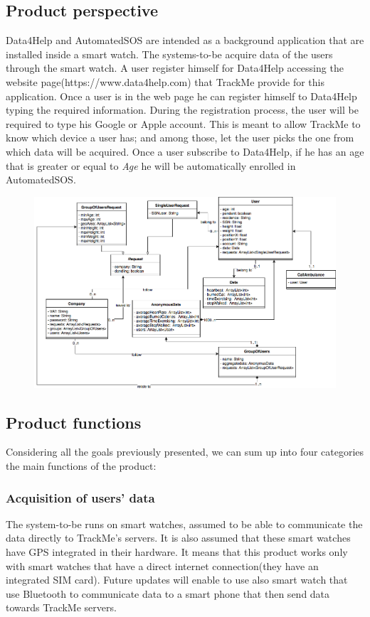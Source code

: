 \documentclass{article}
\begin{document}
\subsection{Product perspective}
Data4Help and AutomatedSOS are intended as a background application that are installed inside a smart watch. The systems-to-be acquire data of the users through the smart watch. A user register himself for Data4Help accessing the website page(https://www.data4help.com) that TrackMe provide for this application. Once a user is in the web page he can register himself to Data4Help typing the required information. During the registration process, the user will be required to type his Google or Apple account. This is meant to allow TrackMe to know which device a user has; and among those, let the user picks the one from which data will be acquired. Once a user subscribe to Data4Help, if he has an age that is greater or equal to \emph{Age} he will be automatically enrolled in AutomatedSOS.
\begin{figure}[h!]
\centering
    \textbf{}\par\medskip
	\includegraphics[width= \linewidth]{model.png}
\end{figure}
\subsection{Product functions}
Considering all the goals previously presented, we can sum up into four categories the main functions of the product: \newpage
\subsubsection{Acquisition of users' data}
The system-to-be runs on smart watches, assumed to be able to communicate the data directly to TrackMe's servers. It is also assumed that these smart watches have GPS integrated in their hardware. It means that this product works only with smart watches that have a direct internet connection(they have an integrated SIM card). Future updates will enable to use also smart watch that use Bluetooth to communicate data to a smart phone that then send data towards TrackMe servers.
\end{document}
